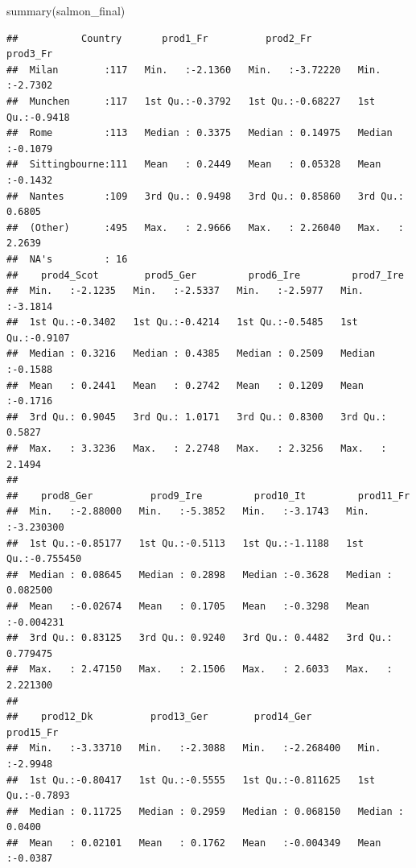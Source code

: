 \documentclass[
]{book}
\newenvironment{Shaded}{\begin{snugshade}}{\end{snugshade}}
\newcommand{\FunctionTok}[1]{\textcolor[rgb]{0.00,0.00,0.00}{#1}}
\newcommand{\NormalTok}[1]{#1}
\begin{document}
\begin{Shaded}
\begin{Highlighting}[]
\FunctionTok{summary}\NormalTok{(salmon\_final)}
\end{Highlighting}
\end{Shaded}

\begin{verbatim}
##           Country       prod1_Fr          prod2_Fr           prod3_Fr      
##  Milan        :117   Min.   :-2.1360   Min.   :-3.72220   Min.   :-2.7302  
##  Munchen      :117   1st Qu.:-0.3792   1st Qu.:-0.68227   1st Qu.:-0.9418  
##  Rome         :113   Median : 0.3375   Median : 0.14975   Median :-0.1079  
##  Sittingbourne:111   Mean   : 0.2449   Mean   : 0.05328   Mean   :-0.1432  
##  Nantes       :109   3rd Qu.: 0.9498   3rd Qu.: 0.85860   3rd Qu.: 0.6805  
##  (Other)      :495   Max.   : 2.9666   Max.   : 2.26040   Max.   : 2.2639  
##  NA's         : 16                                                         
##    prod4_Scot        prod5_Ger         prod6_Ire         prod7_Ire      
##  Min.   :-2.1235   Min.   :-2.5337   Min.   :-2.5977   Min.   :-3.1814  
##  1st Qu.:-0.3402   1st Qu.:-0.4214   1st Qu.:-0.5485   1st Qu.:-0.9107  
##  Median : 0.3216   Median : 0.4385   Median : 0.2509   Median :-0.1588  
##  Mean   : 0.2441   Mean   : 0.2742   Mean   : 0.1209   Mean   :-0.1716  
##  3rd Qu.: 0.9045   3rd Qu.: 1.0171   3rd Qu.: 0.8300   3rd Qu.: 0.5827  
##  Max.   : 3.3236   Max.   : 2.2748   Max.   : 2.3256   Max.   : 2.1494  
##                                                                         
##    prod8_Ger          prod9_Ire         prod10_It         prod11_Fr        
##  Min.   :-2.88000   Min.   :-5.3852   Min.   :-3.1743   Min.   :-3.230300  
##  1st Qu.:-0.85177   1st Qu.:-0.5113   1st Qu.:-1.1188   1st Qu.:-0.755450  
##  Median : 0.08645   Median : 0.2898   Median :-0.3628   Median : 0.082500  
##  Mean   :-0.02674   Mean   : 0.1705   Mean   :-0.3298   Mean   :-0.004231  
##  3rd Qu.: 0.83125   3rd Qu.: 0.9240   3rd Qu.: 0.4482   3rd Qu.: 0.779475  
##  Max.   : 2.47150   Max.   : 2.1506   Max.   : 2.6033   Max.   : 2.221300  
##                                                                            
##    prod12_Dk          prod13_Ger        prod14_Ger          prod15_Fr      
##  Min.   :-3.33710   Min.   :-2.3088   Min.   :-2.268400   Min.   :-2.9948  
##  1st Qu.:-0.80417   1st Qu.:-0.5555   1st Qu.:-0.811625   1st Qu.:-0.7893  
##  Median : 0.11725   Median : 0.2959   Median : 0.068150   Median : 0.0400  
##  Mean   : 0.02101   Mean   : 0.1762   Mean   :-0.004349   Mean   :-0.0387  

\end{verbatim}
\end{document}
